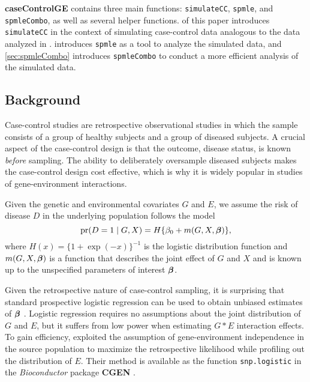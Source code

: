 \documentclass{article}\usepackage[]{graphicx}\usepackage[]{color}
\def\bbeta{\mbox{\boldmath $\beta$}}
\def\pr{\hbox{pr}}
\def\code#1{\texttt{#1}}
\def\pkg#1{\textbf{#1}}
\begin{document}
\pkg{caseControlGE} contains three main functions: \code{simulateCC}, \code{spmle}, and \code{spmleCombo}, as well as several helper functions.   of this paper introduces \code{simulateCC} in the context of simulating case-control data analogous to the data analyzed in \cite{Wang2018unpublished}.   introduces \code{spmle} as a tool to analyze the simulated data, and \cref{sec:spmleCombo} introduces \code{spmleCombo} to conduct a more efficient analysis of the simulated data.

\subsection{Background}

Case-control studies are retrospective observational studies in which the sample consists of a group of healthy subjects and a group of diseased subjects.  A crucial aspect of the case-control design is that the outcome, disease status, is known \emph{before} sampling.  The ability to deliberately oversample diseased subjects makes the case-control design cost effective, which is why it is widely popular in studies of gene-environment interactions.

Given the genetic and environmental covariates $G$ and $E$, we assume the risk of disease $D$ in the underlying population follows the model
\begin{equation}
  \pr(D=1 \mid G,X) = H\{\beta_0 + m(G,X,\bbeta)\}, \label{eq:logisticRisk}
\end{equation}
where $H(x)=\{ 1 + \exp(-x)\}^{-1}$ is the logistic distribution function and $m(G,X,\bbeta)$ is a function that describes the joint effect of $G$ and $X$ and is known up to the unspecified parameters of interest $\bbeta$.

Given the retrospective nature of case-control sampling, it is surprising that standard prospective logistic regression can be used to obtain unbiased estimates of $\bbeta$ \citep{PrenticePyke1979}.  Logistic regression requires no assumptions about the joint distribution of $G$ and $E$, but it suffers from low power when estimating $G * E$ interaction effects.  To gain efficiency, \citet{ChatterjeeCarroll2005} exploited the assumption of gene-environment independence in the source population to maximize the retrospective likelihood while profiling out the distribution of $E$.  Their method is available as the function \code{snp.logistic} in the \emph{Bioconductor} package \pkg{CGEN} \citep{CGEN2012}.
\end{document}
